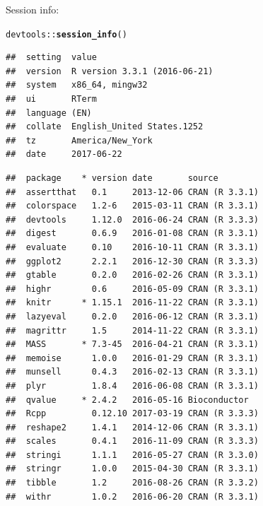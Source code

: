 \documentclass{article}\usepackage[]{graphicx}\usepackage[]{color}
\makeatletter
\newcommand{\hlopt}[1]{\textcolor[rgb]{0,0,0}{#1}}%
\newcommand{\hlstd}[1]{\textcolor[rgb]{0.345,0.345,0.345}{#1}}%
\newcommand{\hlkwd}[1]{\textcolor[rgb]{0.737,0.353,0.396}{\textbf{#1}}}%
\newenvironment{kframe}{%
 \def\at@end@of@kframe{}%
 \ifinner\ifhmode%
  \def\at@end@of@kframe{\end{minipage}}%
  \begin{minipage}{\columnwidth}%
 \fi\fi%
 \def\FrameCommand##1{\hskip\@totalleftmargin \hskip-\fboxsep
 \colorbox{shadecolor}{##1}\hskip-\fboxsep
     \hskip-\linewidth \hskip-\@totalleftmargin \hskip\columnwidth}%
 \MakeFramed {\advance\hsize-\width
   \@totalleftmargin\z@ \linewidth\hsize
   \@setminipage}}%
 {\par\unskip\endMakeFramed%
 \at@end@of@kframe}
\newenvironment{knitrout}{}{} %
\makeatother
\begin{document}
Session info:
\begin{knitrout}
\color{fgcolor}\begin{kframe}
\begin{alltt}
\hlstd{devtools}\hlopt{::}\hlkwd{session_info}\hlstd{()}
\end{alltt}


{\ttfamily\noindent\itshape\color{messagecolor}{\#\# Session info -----------------------------------------------}}\begin{verbatim}
##  setting  value                       
##  version  R version 3.3.1 (2016-06-21)
##  system   x86_64, mingw32             
##  ui       RTerm                       
##  language (EN)                        
##  collate  English_United States.1252  
##  tz       America/New_York            
##  date     2017-06-22
\end{verbatim}


{\ttfamily\noindent\itshape\color{messagecolor}{\#\# Packages ---------------------------------------------------}}\begin{verbatim}
##  package    * version date       source        
##  assertthat   0.1     2013-12-06 CRAN (R 3.3.1)
##  colorspace   1.2-6   2015-03-11 CRAN (R 3.3.1)
##  devtools     1.12.0  2016-06-24 CRAN (R 3.3.3)
##  digest       0.6.9   2016-01-08 CRAN (R 3.3.1)
##  evaluate     0.10    2016-10-11 CRAN (R 3.3.1)
##  ggplot2      2.2.1   2016-12-30 CRAN (R 3.3.3)
##  gtable       0.2.0   2016-02-26 CRAN (R 3.3.1)
##  highr        0.6     2016-05-09 CRAN (R 3.3.1)
##  knitr      * 1.15.1  2016-11-22 CRAN (R 3.3.1)
##  lazyeval     0.2.0   2016-06-12 CRAN (R 3.3.1)
##  magrittr     1.5     2014-11-22 CRAN (R 3.3.1)
##  MASS       * 7.3-45  2016-04-21 CRAN (R 3.3.1)
##  memoise      1.0.0   2016-01-29 CRAN (R 3.3.1)
##  munsell      0.4.3   2016-02-13 CRAN (R 3.3.1)
##  plyr         1.8.4   2016-06-08 CRAN (R 3.3.1)
##  qvalue     * 2.4.2   2016-05-16 Bioconductor  
##  Rcpp         0.12.10 2017-03-19 CRAN (R 3.3.3)
##  reshape2     1.4.1   2014-12-06 CRAN (R 3.3.1)
##  scales       0.4.1   2016-11-09 CRAN (R 3.3.3)
##  stringi      1.1.1   2016-05-27 CRAN (R 3.3.0)
##  stringr      1.0.0   2015-04-30 CRAN (R 3.3.1)
##  tibble       1.2     2016-08-26 CRAN (R 3.3.2)
##  withr        1.0.2   2016-06-20 CRAN (R 3.3.1)
\end{verbatim}
\end{kframe}
\end{knitrout}
\end{document}
